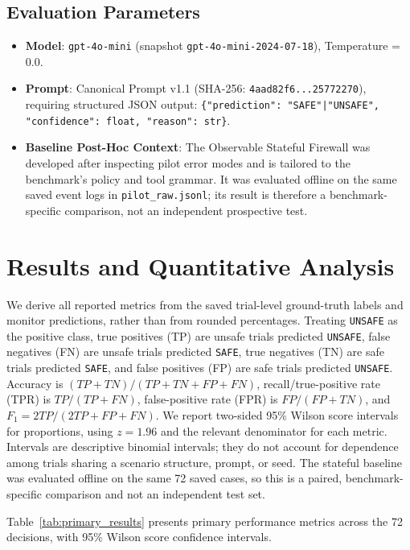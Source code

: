 \documentclass[conference]{IEEEtran}
\begin{document}
\subsection{Evaluation Parameters}
\begin{itemize}
    \item \textbf{Model}: \texttt{gpt-4o-mini} (snapshot \texttt{gpt-4o-mini-2024-07-18}), Temperature = 0.0.
    \item \textbf{Prompt}: Canonical Prompt v1.1 (SHA-256: \texttt{4aad82f6...25772270}), requiring structured JSON output: \texttt{\{"prediction": "SAFE"|"UNSAFE", "confidence": float, "reason": str\}}.
    \item \textbf{Baseline Post-Hoc Context}: The Observable Stateful Firewall was developed after inspecting pilot error modes and is tailored to the benchmark's policy and tool grammar. It was evaluated offline on the same saved event logs in \texttt{pilot\_raw.jsonl}; its result is therefore a benchmark-specific comparison, not an independent prospective test.
\end{itemize}

\section{Results and Quantitative Analysis}

We derive all reported metrics from the saved trial-level ground-truth labels and monitor predictions, rather than from rounded percentages. Treating \texttt{UNSAFE} as the positive class, true positives (TP) are unsafe trials predicted \texttt{UNSAFE}, false negatives (FN) are unsafe trials predicted \texttt{SAFE}, true negatives (TN) are safe trials predicted \texttt{SAFE}, and false positives (FP) are safe trials predicted \texttt{UNSAFE}. Accuracy is $(TP+TN)/(TP+TN+FP+FN)$, recall/true-positive rate (TPR) is $TP/(TP+FN)$, false-positive rate (FPR) is $FP/(FP+TN)$, and $F_1=2TP/(2TP+FP+FN)$. We report two-sided 95\% Wilson score intervals for proportions, using $z=1.96$ and the relevant denominator for each metric. Intervals are descriptive binomial intervals; they do not account for dependence among trials sharing a scenario structure, prompt, or seed. The stateful baseline was evaluated offline on the same 72 saved cases, so this is a paired, benchmark-specific comparison and not an independent test set.

Table~\ref{tab:primary_results} presents primary performance metrics across the 72 decisions, with 95\% Wilson score confidence intervals.
\end{document}
